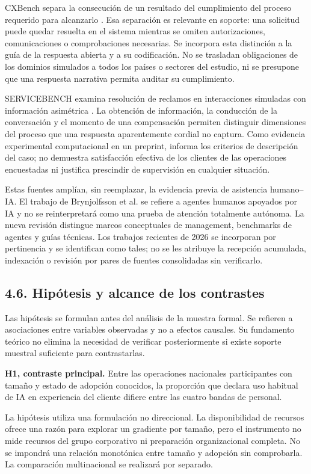 \documentclass[12pt,letterpaper]{article}
\begin{document}
CXBench separa la consecución de un resultado del cumplimiento del proceso requerido para alcanzarlo \citep{cxbench}. Esa separación es relevante en soporte: una solicitud puede quedar resuelta en el sistema mientras se omiten autorizaciones, comunicaciones o comprobaciones necesarias. Se incorpora esta distinción a la guía de la respuesta abierta y a su codificación. No se trasladan obligaciones de los dominios simulados a todos los países o sectores del estudio, ni se presupone que una respuesta narrativa permita auditar su cumplimiento.

SERVICEBENCH examina resolución de reclamos en interacciones simuladas con información asimétrica \citep{servicebench}. La obtención de información, la conducción de la conversación y el momento de una compensación permiten distinguir dimensiones del proceso que una respuesta aparentemente cordial no captura. Como evidencia experimental computacional en un preprint, informa los criterios de descripción del caso; no demuestra satisfacción efectiva de los clientes de las operaciones encuestadas ni justifica prescindir de supervisión en cualquier situación.

Estas fuentes amplían, sin reemplazar, la evidencia previa de asistencia humano--IA. El trabajo de Brynjolfsson et al. se refiere a agentes humanos apoyados por IA y no se reinterpretará como una prueba de atención totalmente autónoma. La nueva revisión distingue marcos conceptuales de management, benchmarks de agentes y guías técnicas. Los trabajos recientes de 2026 se incorporan por pertinencia y se identifican como tales; no se les atribuye la recepción acumulada, indexación o revisión por pares de fuentes consolidadas sin verificarlo.

\subsection*{4.6. Hipótesis y alcance de los contrastes}
Las hipótesis se formulan antes del análisis de la muestra formal. Se refieren a asociaciones entre variables observadas y no a efectos causales. Su fundamento teórico no elimina la necesidad de verificar posteriormente si existe soporte muestral suficiente para contrastarlas.

\textbf{H1, contraste principal.} Entre las operaciones nacionales participantes con tamaño y estado de adopción conocidos, la proporción que declara uso habitual de IA en experiencia del cliente difiere entre las cuatro bandas de personal.

La hipótesis utiliza una formulación no direccional. La disponibilidad de recursos ofrece una razón para explorar un gradiente por tamaño, pero el instrumento no mide recursos del grupo corporativo ni preparación organizacional completa. No se impondrá una relación monotónica entre tamaño y adopción sin comprobarla. La comparación multinacional se realizará por separado.
\end{document}
